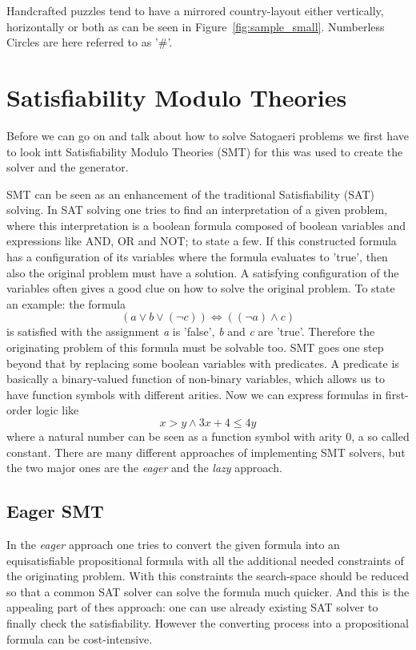 \documentclass[a4paper,10pt]{paper}
\begin{document}
Handcrafted puzzles tend to have a mirrored country-layout either vertically, horizontally or both as can be seen in Figure~\ref{fig:sample_small}. Numberless Circles are here referred to as '\#'.

\section{Satisfiability Modulo Theories}
Before we can go on and talk about how to solve Satogaeri problems we first have to look intt Satisfiability Modulo Theories (SMT) for this was used to create the solver and the generator.

SMT can be seen as an enhancement of the traditional Satisfiability (SAT) solving. In SAT solving one tries to find an interpretation of a given problem, where this interpretation is a boolean formula composed of boolean variables and expressions like AND, OR and NOT; to state a few. If this constructed formula has a configuration of its variables where the formula evaluates to 'true', then also the original problem must have a solution. A satisfying configuration of the variables often gives a good clue on how to solve the original problem.
To state an example: the formula
\[(a \lor b \lor (\neg c)) \iff ((\neg a) \land c)\]
is satisfied with the assignment \textit{a} is 'false', \textit{b} and \textit{c} are 'true'. Therefore the originating problem of this formula must be solvable too.
SMT goes one step beyond that by replacing some boolean variables with predicates. A predicate is basically a binary-valued function of non-binary variables, which allows us to have function symbols with different arities. Now we can express formulas in first-order logic like
\[x > y \land 3 x + 4 \leq 4 y\]
where a natural number can be seen as a function symbol with arity 0, a so called constant.
There are many different approaches of implementing SMT solvers, but the two major ones are the \textit{eager} and the \textit{lazy} approach.
\subsection{Eager SMT}
In the \textit{eager} approach one tries to convert the given formula into an equisatisfiable propositional formula with all the additional needed constraints of the originating problem. With this constraints the search-space should be reduced so that a common SAT solver can solve the formula much quicker. And this is the appealing part of thes approach: one can use already existing SAT solver to finally check the satisfiability. However the converting process into a propositional formula can be cost-intensive.\cite{2009satisfiability}
\end{document}
